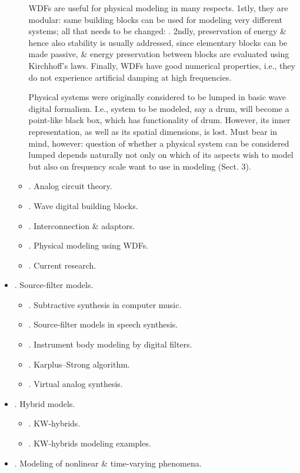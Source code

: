 \documentclass{article}
\begin{document}
\begin{itemize}
\begin{itemize}
		WDFs are useful for physical modeling in many respects. 1stly, they are modular: same building blocks can be used for modeling very different systems; all that needs to be changed: . 2ndly, preservation of energy \& hence also stability is usually addressed, since elementary blocks can be made passive, \& energy preservation between blocks are evaluated using Kirchhoff's laws. Finally, WDFs have good numerical properties, i.e., they do not experience artificial damping at high frequencies.
		
		Physical systems were originally considered to be lumped in basic wave digital formalism. I.e., system to be modeled, say a drum, will become a point-like black box, which has functionality of drum. However, its inner representation, as well as its spatial dimensions, is lost. Must bear in mind, however: question of whether a physical system can be considered lumped depends naturally not only on which of its aspects wish to model but also on frequency scale want to use in modeling (Sect. 3).
		\item {. Analog circuit theory.}
		\item {. Wave digital building blocks.}
		\item {. Interconnection \& adaptors.}
		\item {. Physical modeling using WDFs.}
		\item {. Current research.}
	\end{itemize}
	\item {. Source-filter models.}
	\begin{itemize}
		\item {. Subtractive synthesis in computer music.}
		\item {. Source-filter models in speech synthesis.}
		\item {. Instrument body modeling by digital filters.}
		\item {. Karplus--Strong algorithm.}
		\item {. Virtual analog synthesis.}
	\end{itemize}
	\item {. Hybrid models.}
	\begin{itemize}
		\item {. KW-hybrids.}
		\item {. KW-hybrids modeling examples.}
	\end{itemize}
	\item {. Modeling of nonlinear \& time-varying phenomena.}

\end{itemize}
\end{document}
